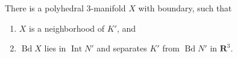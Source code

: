 There is a polyhedral $3$-manifold $X$ with boundary, such that
\begin{enumerate}
\item[(1)] $X$ is a neighborhood of $K'$, and
\item[(2)] $\operatorname{Bd} X$ lies in $\operatorname{Int} N'$ and separates $K'$ from $\operatorname{Bd} N'$ in $\mathbf{R}^3$.
\end{enumerate}

